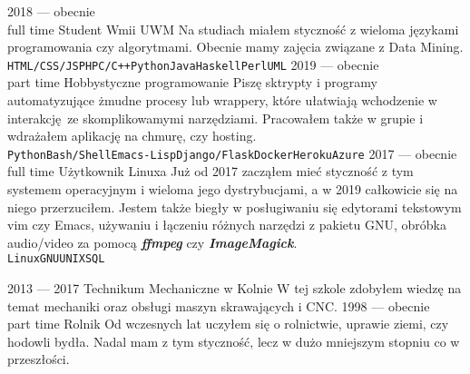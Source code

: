 \documentclass[9pt]{developercv} %
\begin{document}
\begin{entrylist}
    \entry
    {2018 --- obecnie\\\footnotesize{full time}}
    {Student}
    {Wmii UWM}
    {Na studiach miałem styczność z wieloma językami programowania czy algorytmami. Obecnie mamy zajęcia związane z Data Mining.\\ \texttt{HTML/CSS/JS}\slashsep\texttt{PHP}\slashsep\texttt{C/C++}\slashsep\texttt{Python}\slashsep\texttt{Java}\slashsep\texttt{Haskell}\slashsep\texttt{Perl}\slashsep\texttt{UML}}
    \entry
    {2019 --- obecnie\\\footnotesize{part time}}
    {Hobbystyczne programowanie}
    {}
    {Piszę sktrypty i programy automatyzujące żmudne procesy lub wrappery, które ułatwiają wchodzenie w interakcję ze skomplikowamymi narzędziami. Pracowałem także w grupie i wdrażałem aplikację na chmurę, czy hosting.\\ \texttt{Python}\slashsep\texttt{Bash/Shell}\slashsep\texttt{Emacs-Lisp}\slashsep\texttt{Django/Flask}\slashsep\texttt{Docker}\slashsep\texttt{Heroku}\slashsep\texttt{Azure}}
    \entry
    {2017 --- obecnie\\\footnotesize{full time}}
    {Użytkownik Linuxa}
    {}
    {Już od 2017 zacząłem mieć styczność z tym systemem operacyjnym i wieloma jego dystrybucjami, a w 2019 całkowicie się na niego przerzuciłem. Jestem także biegły w posługiwaniu się edytorami tekstowym vim czy Emacs, używaniu i łączeniu różnych narzędzi z pakietu GNU, obróbka audio/video za pomocą \textbf{\textit{ffmpeg}} czy \textbf{\textit{ImageMagick}}.\\ \texttt{Linux}\slashsep\texttt{GNU}\slashsep\texttt{UNIX}\slashsep\texttt{SQL}}
\end{entrylist}



\begin{entrylist}
    \entry
    {2013 --- 2017}
    {Technikum Mechaniczne w Kolnie}
    {}
    {W tej szkole zdobyłem wiedzę na temat mechaniki oraz obsługi maszyn skrawających i CNC.}
    \entry
    {1998 --- obecnie\\\footnotesize{part time}}
    {Rolnik}
    {}
    {Od wczesnych lat uczyłem się o rolnictwie, uprawie ziemi, czy hodowli bydła. Nadal mam z tym styczność, lecz w dużo mniejszym stopniu co w przeszłości.}
\end{entrylist}
\end{document}
